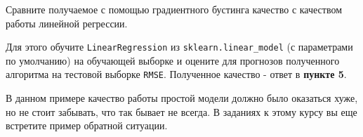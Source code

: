 \documentclass[11pt]{article}
\begin{document}
Сравните получаемое с помощью градиентного бустинга качество с качеством
работы линейной регрессии.

Для этого обучите \texttt{LinearRegression} из
\texttt{sklearn.linear\_model} (с параметрами по умолчанию) на обучающей
выборке и оцените для прогнозов полученного алгоритма на тестовой
выборке \texttt{RMSE}. Полученное качество - ответ в \textbf{пункте 5}.

В данном примере качество работы простой модели должно было оказаться
хуже, но не стоит забывать, что так бывает не всегда. В заданиях к этому
курсу вы еще встретите пример обратной ситуации.


    
    
    
    
\end{document}
